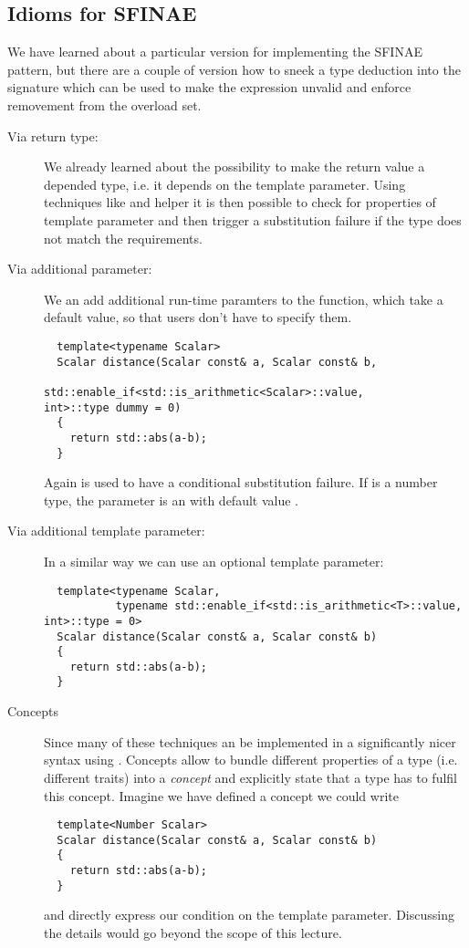 \subsection{Idioms for SFINAE}

We have learned about a particular version for implementing the SFINAE
pattern, but there are a couple of version how to sneek a
type deduction into the signature which can be used to make the
expression unvalid and enforce removement from the overload set.

\begin{description}
\item[Via return type:] We already learned about the possibility to make the return
  value a depended type, i.e. it depends on the template parameter.
  Using techniques like  and helper  it
  is then possible to check for properties of template parameter and
  then trigger a substitution failure if the type does not match the
  requirements.
\item[Via additional parameter:] We an add additional run-time
  paramters to the function, which take a default value, so that users
  don't have to specify them.
  \begin{example}
  \begin{verbatim}
  template<typename Scalar>
  Scalar distance(Scalar const& a, Scalar const& b,
                  std::enable_if<std::is_arithmetic<Scalar>::value,
int>::type dummy = 0)
  {
    return std::abs(a-b);
  }
\end{verbatim}
    Again  is used to have a conditional substitution
    failure. If  is a number type, the parameter
     is an  with default value .
  \end{example}
\item[Via additional template parameter:] In a similar way we can use
  an optional template parameter:
  \begin{example}
  \begin{verbatim}
  template<typename Scalar,
           typename std::enable_if<std::is_arithmetic<T>::value,
int>::type = 0>
  Scalar distance(Scalar const& a, Scalar const& b)
  {
    return std::abs(a-b);
  }
\end{verbatim}
  \end{example}
\item[Concepts] Since  many of these techniques an be
  implemented in a significantly nicer syntax using . Concepts allow to bundle different properties of a type
  (i.e. different traits) into a \emph{concept} and explicitly state
  that a type has to fulfil this concept. Imagine we have defined a
  concept  we could write
  \begin{verbatim}
  template<Number Scalar>
  Scalar distance(Scalar const& a, Scalar const& b)
  {
    return std::abs(a-b);
  }
\end{verbatim}
  and directly express our condition on the template
  parameter. Discussing the details would go beyond the scope of this
  lecture.
\end{description}
